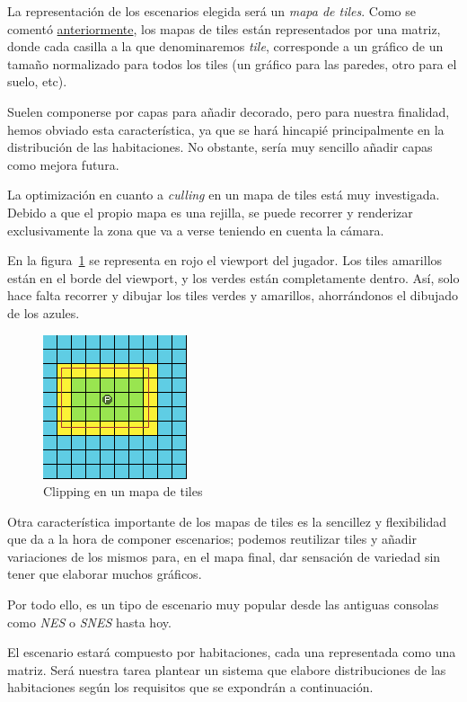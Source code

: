 La representación de los escenarios elegida será un \emph{mapa de tiles}. Como se comentó \hyperref[maptiles-r]{anteriormente}, los mapas de tiles están representados por una matriz, donde cada casilla a la que denominaremos \emph{tile}, corresponde a un gráfico de un tamaño normalizado para todos los tiles (un gráfico para las paredes, otro para el suelo, etc).

Suelen componerse por capas para añadir decorado, pero para nuestra finalidad, hemos obviado esta característica, ya que se hará hincapié principalmente en la distribución de las habitaciones. No obstante, sería muy sencillo añadir capas como mejora futura.

La optimización en cuanto a \emph{culling}\cite{culling} en un mapa de tiles está muy investigada. Debido a que el propio mapa es una rejilla, se puede recorrer y renderizar exclusivamente la zona que va a verse teniendo en cuenta la cámara.

En la figura~\ref{fig:tileclip} se representa en rojo el viewport del jugador. Los tiles amarillos están en el borde del viewport, y los verdes están completamente dentro. Así, solo hace falta recorrer y dibujar los tiles verdes y amarillos, ahorrándonos el dibujado de los azules.

\begin{figure}[t]
\centering
\includegraphics[scale=1]{img/tileclip}
\caption{Clipping en un mapa de tiles
\label{fig:tileclip}}
\end{figure}

Otra característica importante de los mapas de tiles es la sencillez y flexibilidad que da a la hora de componer escenarios; podemos reutilizar tiles y añadir variaciones de los mismos para, en el mapa final, dar sensación de variedad sin tener que elaborar muchos gráficos.

Por todo ello, es un tipo de escenario muy popular desde las antiguas consolas como \emph{NES} o \emph{SNES} hasta hoy.

El escenario estará compuesto por habitaciones, cada una representada como una matriz. Será nuestra tarea plantear un sistema que elabore distribuciones de las habitaciones según los requisitos que se expondrán a continuación.

